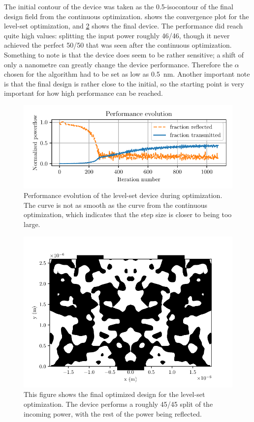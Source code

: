 The initial contour of the device was taken as the 0.5-isocontour of the final
design field from the continuous optimization.
 shows the convergence plot for the level-set optimization,
and \cref{fig:bin_design} shows the final device.
The performance did reach quite high values: splitting the input power roughly
46/46, though it never achieved the perfect 50/50 that was seen after the
continuous optimization.
Something to note is that the device does seem to be rather sensitive;
a shift of only a nanometre can greatly change the device performance.
Therefore the $\alpha$ chosen for the algorithm had to be set as low as
\qty{0.5}{\nm}.
Another important note is that the final design is rather close to the initial,
so the starting point is very important for how high performance can be reached.

\begin{figure}[htpb]
	\centering
	\includegraphics{chapters/results/conv_tmp.pdf}
	\caption{%
		Performance evolution of the level-set device during optimization.
		The curve is not as smooth as the curve from the continuous
		optimization, which indicates that the step size is closer to being too
		large.
	}%
	\label{fig:bin_conv}
\end{figure}

\begin{figure}[htpb]
	\centering
	\includegraphics{chapters/results/bin_design_tmp_254.pdf}
	\caption{%
		This figure shows the final optimized design for the level-set
		optimization. The device performs a roughly 45/45 split of the incoming
		power, with the rest of the power being reflected.
	}%
	\label{fig:bin_design}
\end{figure}
